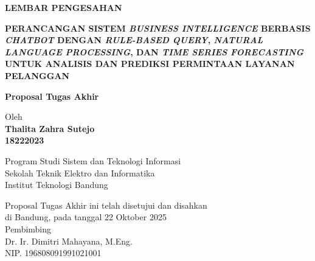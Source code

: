 \documentclass[12pt,a4paper,oneside]{book}
\begin{document}
\newpage
\thispagestyle{empty}
\begin{center}
  \textbf{\large LEMBAR PENGESAHAN}\\[1cm]
  \vspace*{1.5cm}
    
  {\large\bfseries PERANCANGAN SISTEM \textit{BUSINESS INTELLIGENCE} BERBASIS \textit{CHATBOT} DENGAN \textit{RULE-BASED QUERY}, \textit{NATURAL LANGUAGE PROCESSING}, DAN \textit{TIME SERIES FORECASTING} UNTUK ANALISIS DAN PREDIKSI PERMINTAAN LAYANAN PELANGGAN}\\
     \vspace{2cm}

  {\Large \textbf{Proposal Tugas Akhir}}\\


  \vspace{1.5cm}
    
    
  {\large Oleh}\\[0.3cm]
    \textbf{
    {\large Thalita Zahra Sutejo}\\
    {\large 18222023}
  }\\
    
  \vspace{0.5cm}
 
  {\large Program Studi Sistem dan Teknologi Informasi}\\
  {\large Sekolah Teknik Elektro dan Informatika}\\
  {\large Institut Teknologi Bandung}\\

  \vspace{1.5cm}

  Proposal Tugas Akhir ini telah disetujui dan disahkan\\ 
  di Bandung, pada tanggal 22 Oktober 2025\\[1cm]

	Pembimbing  \\[3cm]
	Dr. Ir. Dimitri Mahayana, M.Eng.   \\[0.2cm]
	NIP. 196808091991021001 

\end{center}

\vspace{1cm}
\noindent
\end{document}
